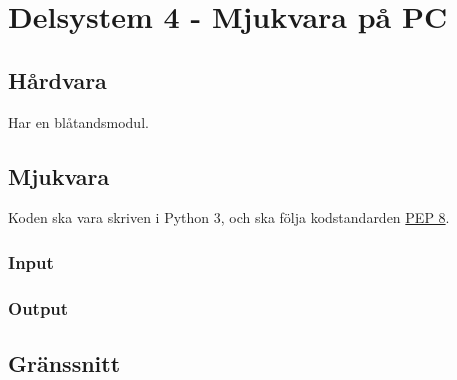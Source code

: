 \documentclass[a4paper,11pt]{article}
\begin{document}
\section{Delsystem 4 - Mjukvara på PC}

\subsection{Hårdvara}
Har en blåtandsmodul.

\subsection{Mjukvara}

Koden ska vara skriven i Python 3, och ska följa kodstandarden \href{https://www.python.org/dev/peps/pep-0008/}{PEP 8}.

\subsubsection{Input}

\subsubsection{Output}

\subsection{Gränssnitt} \label{ssec:PCInterface}
\end{document}
